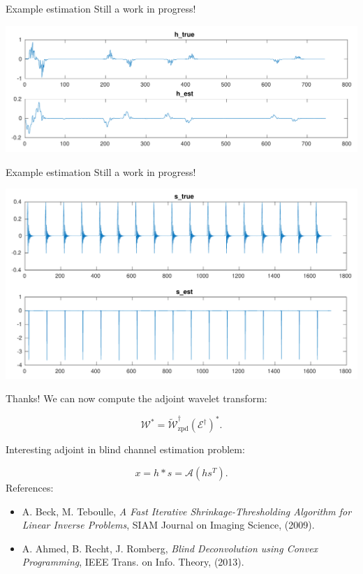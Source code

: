 \documentclass[xcolor=dvipsnames,t]{beamer} %
\begin{document}
\begin{frame}{Example estimation}
   Still a work in progress!\\
   \begin{center}
      \includegraphics[width=\textwidth]{figures/bce_rec_02_h_trim.pdf}
   \end{center}
\end{frame}

\begin{frame}{Example estimation}
   Still a work in progress!\\
   \begin{center}
      \includegraphics[width=\textwidth]{figures/bce_rec_02_s_trim.pdf}
   \end{center}
\end{frame}



\begin{frame}{Thanks!}
   We can now compute the adjoint wavelet transform:

   \[ \mathcal{W}^\ast = \tilde{\mathcal{W}}_\text{zpd}^\dagger(\mathcal{E}^\dagger)^\ast. \] 
   
   Interesting adjoint in blind channel estimation problem:

   \[ x = h\ast s = \mathcal{A}(hs^T). \] 
   References:
   \begin{itemize}
      \item A. Beck, M. Teboulle, \emph{A Fast Iterative Shrinkage-Thresholding Algorithm for Linear Inverse Problems}, SIAM Journal on Imaging Science, (2009).
      \item A. Ahmed, B. Recht, J. Romberg, \emph{Blind Deconvolution using Convex Programming}, IEEE Trans. on Info. Theory, (2013).
   \end{itemize}
\end{frame}
\end{document}
